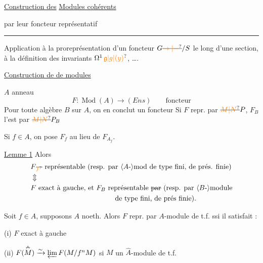 \uline{Construction des} \uline{Modules cohérents}

 par leur foncteur représentatif

\noindent\hfill\rule{1.3cm}{0.5pt}\hfill\mbox{}

Application à la proreprésentation d'un foncteur $G\deleted{\unsure{\to|-}}/S$ le long d'une section, à la définition des invariants $\Omega^{1}\,\unsure{\mathfrak{g}|g|(y)}$, \ldots.

\margin{$\big/\!\big/$}\uline{Construction de  de modules}

$A$ anneau 
\[
F:\operatorname{Mod}(A)\longrightarrow(\mathit{Ens})\qquad\text{foncteur}
\]
Pour toute algèbre $B$ sur $A$, on en conclut un foncteur
Si $F$ repr. par $\deleted{\unsure{M|N}}P$, $F_B$ l'est par $\deleted{\unsure{M|N}}P_B$

Si $f\in A$, on pose $F_f$ au lieu de $F_{A_f}$.

\uline{Lemme 1}   Alors
\[
\begin{aligned}
&F\deleted{{}_{\unsure{f}}}\ \text{représentable (resp. par \inserted{$A$-}mod de type fini, de prés. finie)}\\
&\Updownarrow\\
&F\ \text{exact à gauche, et } F_B\ \text{représentable \deleted{par} (resp. par \inserted{$B$-}module}\\
&\hspace{12em}\text{de type fini, de prés finie).}
\end{aligned}
\]

  Soit $f\in A$, supposons $A$ noeth. Alors $F$ repr.  par  $A$-module de t.f. ssi il satisfait :

(i) $F$ exact à gauche

(ii) $F(\overset{\deleted{\wedge}}{M})\xrightarrow{\sim}\varprojlim F(M/f^nM)$ \quad si $M$ un $\widehat A$-module  de t.f. 

